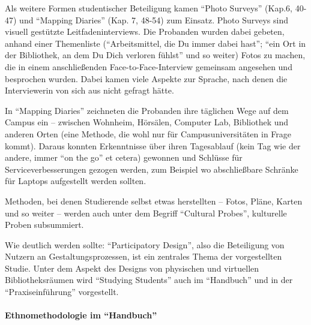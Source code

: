\documentclass[a4paper,
fontsize=11pt,
oneside,
numbers=noperiodatend,
parskip=half-,
bibliography=totoc,
final
]{scrartcl}
\begin{document}
Als weitere Formen studentischer Beteiligung kamen \enquote{Photo
Surveys} (Kap.6, 40-47) und \enquote{Mapping Diaries} (Kap. 7, 48-54)
zum Einsatz. Photo Surveys sind visuell gestützte Leitfadeninterviews.
Die Probanden wurden dabei gebeten, anhand einer Themenliste
(\enquote{Arbeitsmittel, die Du immer dabei hast}; \enquote{ein Ort in
der Bibliothek, an dem Du Dich verloren fühlst} und so weiter) Fotos zu
machen, die in einem anschließenden Face-to-Face-Interview gemeinsam
angesehen und besprochen wurden. Dabei kamen viele Aspekte zur Sprache,
nach denen die Interviewerin von sich aus nicht gefragt hätte.

In \enquote{Mapping Diaries} zeichneten die Probanden ihre täglichen
Wege auf dem Campus ein -- zwischen Wohnheim, Hörsälen, Computer Lab,
Bibliothek und anderen Orten (eine Methode, die wohl nur für
Campusuniversitäten in Frage kommt). Daraus konnten Erkenntnisse über
ihren Tagesablauf (kein Tag wie der andere, immer \enquote{on the go} et
cetera) gewonnen und Schlüsse für Serviceverbesserungen gezogen werden,
zum Beispiel wo abschließbare Schränke für Laptops aufgestellt werden
sollten.

Methoden, bei denen Studierende selbst etwas herstellten -- Fotos,
Pläne, Karten und so weiter -- werden auch unter dem Begriff
\enquote{Cultural Probes}, kulturelle Proben subsummiert.

Wie deutlich werden sollte: \enquote{Participatory Design}, also die
Beteiligung von Nutzern an Gestaltungsprozessen, ist ein zentrales Thema
der vorgestellten Studie. Unter dem Aspekt des Designs von physischen
und virtuellen Bibliotheksräumen wird \enquote{Studying Students} auch
im \enquote{Handbuch} und in der \enquote{Praxiseinführung} vorgestellt.

\paragraph{Ethnomethodologie im
\enquote{Handbuch}}\label{ethnomethodologie-im-handbuch}
\end{document}
